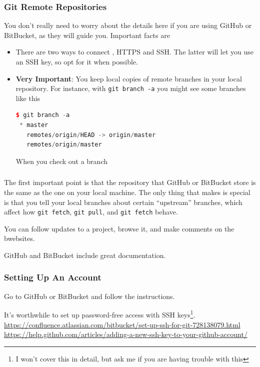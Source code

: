 \documentclass{beamer}
\begin{document}
\begin{frame}[fragile]
\frametitle{Git Remote Repositories}
You don't really need to worry about the details here if you are using GitHub or BitBucket, as they will guide you. Important facts are
\begin{itemize}
\item There are two ways to connect , HTTPS and SSH. The latter will let you use an SSH key, so opt for it when possible.
\item \textbf{Very Important}: You keep local copies of remote branches in your local repository. For instance, with \lstinline{git branch -a} you might see some branches like this
\begin{lstlisting}[language=C++]
$ git branch -a
 * master
   remotes/origin/HEAD -> origin/master
   remotes/origin/master
\end{lstlisting}
When you check out a branch 

\end{itemize}

\end{frame}


\begin{frame}[fragile]
\frametitle{}
The first important point is that the repository that GitHub or BitBucket store is the same as the one on your local machine. The only thing that makes is special is that you tell your local branches about certain ``upstream'' branches, which affect how \lstinline{git fetch}, \lstinline{git pull}, and \lstinline{git fetch} behave.

You can follow updates to a project, browse it, and make comments on the bwebsites.

GitHub and BitBucket include great documentation.
\end{frame}

\begin{frame}[fragile]
\frametitle{Setting Up An Account}
Go to GitHub or BitBucket and follow the instructions. 

It's worthwhile to set up password-free access with SSH keys\footnote{I won't cover this in detail, but ask me if you are having trouble with this}.
\href{https://confluence.atlassian.com/bitbucket/set-up-ssh-for-git-728138079.html}{https://confluence.atlassian.com/bitbucket/set-up-ssh-for-git-728138079.html}
\href{https://help.github.com/articles/adding-a-new-ssh-key-to-your-github-account/}{https://help.github.com/articles/adding-a-new-ssh-key-to-your-github-account/}
\end{frame}
\end{document}

